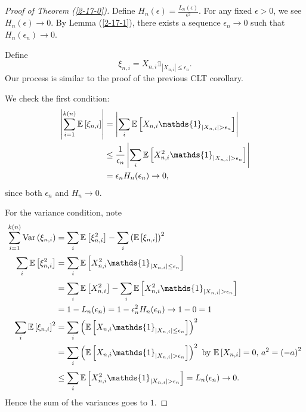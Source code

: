 \theoremproofstyle
\begin{proof}[Proof of Theorem (\ref{2-17-0})]
	Define $H_n(\epsilon) = \frac{L_n(\epsilon)}{\epsilon^2}$. For any fixed $\epsilon > 0$, we see $H_n(\epsilon) \to 0$. By Lemma (\ref{2-17-1}), there exists a sequence $\epsilon_n \to 0$ such that $H_n(\epsilon_n) \to 0$.

	Define \[
		\xi_{n,i} = X_{n,i} \mathds{1}_{ \left| X_{n,i}  \right|\le \epsilon_n}
	.\] 
	Our process is similar to the proof of the previous CLT corollary.

	We check the first condition:
	\begin{align*}
		\left| \sum\limits_{i=1}^{k(n)} \E\left[\xi_{n,i}\right]   \right| 
		&= \left| \sum\limits_{i}^{} \E\left[X_{n,i} \mathds{1}_{\left| X_{n,i} \right| > \epsilon_n}\right]  \right| \\
		&\le \frac{1}{\epsilon_n} \left|\sum\limits_{i}^{} \E\left[X_{n,i}^2 \mathds{1}_{\left| X_{n,i} \right| > \epsilon_n}\right]  \right| \\
		&= \epsilon_n H_n(\epsilon_n) \to 0
	,\end{align*}
	since both $\epsilon_n$ and $H_n \to 0$.

	For the variance condition, note
	\begin{align*}
		\sum\limits_{i=1}^{k(n)} \operatorname{Var}\left(\xi_{n,i}\right)
		&= \sum\limits_{i}^{} \E\left[\xi_{n,i}^2\right] - \sum\limits_{i}^{} \left( \E\left[\xi_{n,i}\right] \right)^2 \\
		\sum\limits_{i}^{} \E\left[\xi_{n,i}^2\right] 
		&= \sum\limits_{i}^{} \E\left[X_{n,i}^2 \mathds{1}_{\left| X_{n,i} \right| \le \epsilon_n}\right]  \\
		&= \sum\limits_{i}^{} \E\left[X_{n,i}^2\right] - \sum\limits_{i}^{} \E\left[X_{n,i}^2 \mathds{1}_{\left| X_{n,i} \right| > \epsilon_n}\right] \\
		&= 1 - L_n(\epsilon_n) = 1-\epsilon_n^2 H_n(\epsilon_n) \to 1-0 = 1 \\
		\sum\limits_{i}^{} \E\left[\xi_{n,i}\right] ^2 
		&= \sum\limits_{i}^{} \left( \E\left[X_{n,i} \mathds{1}_{\left| X_{n,i} \right| \le \epsilon_n}\right]  \right)^2 \\
		&= \sum\limits_{i}^{} \left( \E\left[X_{n,i} \mathds{1}_{\left| X_{n,i} \right| > \epsilon_n}\right]  \right)^2 \text{ by $\E\left[X_{n,i}\right] =0$, $a^2 = \left( -a \right)^2$} \\
		&\le \sum\limits_{i}^{} \E\left[X_{n,i}^2 \mathds{1}_{\left| X_{n,i} \right| > \epsilon_n}\right]  = L_n(\epsilon_n)\to 0
	.\end{align*}
	Hence the sum of the variances goes to $1$.


\end{proof}

